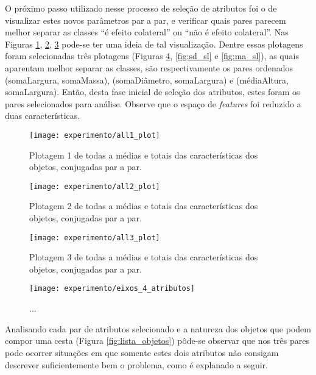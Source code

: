 O próximo passo utilizado nesse processo de seleção de atributos foi o de visualizar estes novos parâmetros par a par, e verificar quais pares parecem melhor separar as classes ``é efeito colateral'' ou ``não é efeito colateral''. Nas Figuras \ref{fig:plotall1}, \ref{fig:plotall2}, \ref{fig:plotall3} pode-se ter uma ideia de tal visualização. Dentre essas plotagens foram selecionadas três plotagens (Figuras \ref{fig:sl_sm}, \ref{fig:sd_sl} e \ref{fig:ma_sl}), as quais aparentam melhor separar as classes, são respectivamente os pares ordenados (somaLargura, somaMassa), (somaDiâmetro, somaLargura) e (médiaAltura, somaLargura). Então, desta fase inicial de seleção dos atributos, estes foram os pares selecionados para análise. Observe que o espaço de \textit{features} foi reduzido a duas características.

\begin{figure}[!htb] \centering 
  \centering
  \texttt{[image: experimento/all1\_plot]} 
  \caption{Plotagem 1 de todas a médias e totais das características dos objetos, conjugadas par a par.} 
  \label{fig:plotall1}
\end{figure}

\begin{figure}[!htb] \centering 
  \centering
  \texttt{[image: experimento/all2\_plot]} 
  \caption{Plotagem 2 de todas a médias e totais das características dos objetos, conjugadas par a par.} 
  \label{fig:plotall2}
\end{figure}

\begin{figure}[!htb] \centering 
  \centering
  \texttt{[image: experimento/all3\_plot]} 
  \caption{Plotagem 3 de todas a médias e totais das características dos objetos, conjugadas par a par.} 
  \label{fig:plotall3}
\end{figure}

\begin{figure}[!htb] \centering 
  \centering
  \texttt{[image: experimento/eixos\_4\_atributos]} 
  \caption{... } 
  \label{fig:sl_sm}
\end{figure}

Analisando cada par de atributos selecionado e a natureza dos objetos que podem compor uma cesta (Figura \ref{fig:lista_objetos}) pôde-se observar que nos três pares pode ocorrer situações em que somente estes dois atributos não consigam descrever suficientemente bem o problema, como é explanado a seguir.

